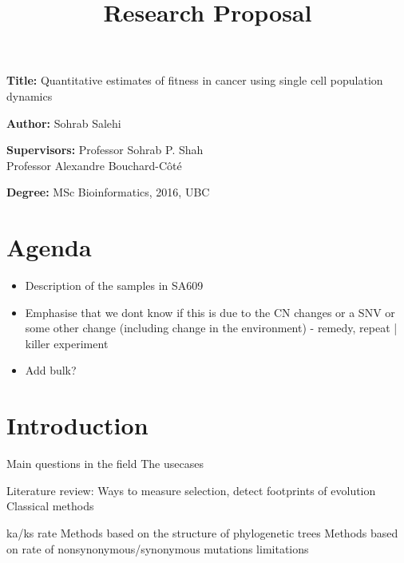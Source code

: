 \documentclass[12pt, a4paper]{article}
\title{Research Proposal}
\author{}
\date{}
\newcommand{\namelistlabel}[1]{\mbox{#1}\hfil}
\newenvironment{namelist}[1]{%
\begin{list}{}
    {
        \let\makelabel\namelistlabel
        \settowidth{\labelwidth}{#1}
        \setlength{\leftmargin}{1.1\labelwidth}
    }
  }{%
\end{list}}
\begin{document}
\maketitle

\begin{namelist}{xxxxxxxxxxxx}
\item[{\bf Title:}]
	Quantitative estimates of fitness in cancer using single cell population dynamics
\item[{\bf Author:}]
	Sohrab Salehi
\item[{\bf Supervisors:}]
	Professor Sohrab P. Shah \\
	Professor Alexandre Bouchard-C\^ot\'e
\item[{\bf Degree:}]
	MSc Bioinformatics, 2016, UBC
\end{namelist}

\section*{Agenda}


 

\begin{itemize}
    \item Description of the samples in SA609
    \item Emphasise that we dont know if this is due to the CN changes or a SNV or some other change (including change in the environment) - remedy, repeat | killer experiment
    \item Add bulk?
    
\end{itemize}




\section*{Introduction} 

Main questions in the field
The usecases

Literature review:
Ways to measure selection, detect footprints of evolution
Classical methods

ka/ks rate
Methods based on the structure of phylogenetic trees 
Methods based on rate of nonsynonymous/synonymous mutations
limitations
\end{document}
